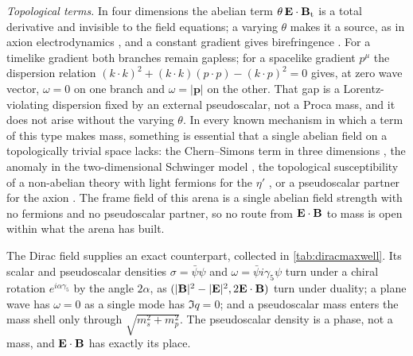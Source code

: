 \emph{Topological terms.} In four dimensions the abelian term $\theta\,\mathbf E\cdot\mathbf B_{\rm t}$ is a total derivative and invisible to the field
equations; a varying $\theta$ makes it a source, as in axion electrodynamics \cite{Wilczek87}, and a constant gradient gives
birefringence \cite{CarrollFieldJackiw90}. For a timelike gradient both branches remain gapless; for a spacelike gradient $p^\mu$ the dispersion relation
$(k\cdot k)^2+(k\cdot k)(p\cdot p)-(k\cdot p)^2=0$ gives, at zero wave vector, $\omega=0$ on one branch and $\omega=|\mathbf p|$ on the other. That gap is a
Lorentz-violating dispersion fixed by an external pseudoscalar, not a Proca mass, and it does not arise without the varying $\theta$. In every known
mechanism in which a term of this type makes mass, something is
essential that a single abelian field on a topologically trivial space lacks: the Chern--Simons term in three dimensions \cite{DJT82}, the
anomaly in the two-dimensional Schwinger model \cite{Schwinger62}, the topological susceptibility of a non-abelian theory with light
fermions for the $\eta'$ \cite{Witten79eta,Veneziano79}, or a pseudoscalar partner for the axion \cite{Weinberg78,Wilczek78}. The frame field
of this arena is a single abelian field strength with no fermions and no pseudoscalar partner, so no route from $\mathbf E\cdot\mathbf B$ to mass is
open within what the arena has built.

The Dirac field supplies an exact counterpart, collected in \cref{tab:diracmaxwell}. Its scalar and pseudoscalar densities
$\sigma=\bar\psi\psi$ and $\omega=\bar\psi i\gamma_5\psi$ turn under a chiral rotation $e^{i\alpha\gamma_5}$ by the angle $2\alpha$, as
$(|\mathbf B|^2-|\mathbf E|^2,2\mathbf E\cdot\mathbf B)$ turn under duality; a plane wave has $\omega=0$ as a single mode has $\Im q=0$; and a pseudoscalar mass enters
the mass shell only through $\sqrt{m_s^2+m_p^2}$. The pseudoscalar density is a phase, not a mass, and $\mathbf E\cdot\mathbf B$ has exactly its place.


